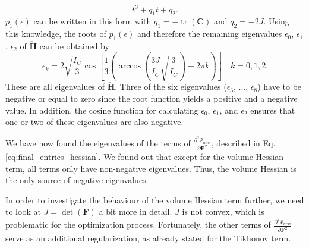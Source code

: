 {{{\[
t^3 + q_1t + q_2. 
\]
$p_1(\epsilon)$ can be written in this form with $q_1=-\operatorname{tr}(\mathbf{C})$ and $q_2= -2J$. Using this knowledge, the roots of $p_1(\epsilon)$ and therefore the remaining eigenvalues $\epsilon_0$, $\epsilon_1$, $\epsilon_2$ of $\mathbf{\check{H}}$ can be obtained by
\begin{equation}
\label{eq:hessian_eigenvalues2}
	\epsilon_k = 2 \sqrt{\frac{I_C}{3}} \operatorname{cos}\left[ \frac{1}{3} \left( \operatorname{arccos}\left(\frac{3 J}{I_C} \sqrt{\frac{3}{I_C}} \right) + 2 \pi k \right) \right] \quad  k= 0,1,2.
\end{equation}
These are all eigenvalues of $\mathbf{\check{H}}$. Three of the six eigenvalues ($\epsilon_3$, ..., $\epsilon_8$) have to be negative or equal to zero since the root function yields a positive and a negative value. In addition, the cosine function for calculating $\epsilon_0$, $\epsilon_1$, and $\epsilon_2$ ensures that one or two of these eigenvalues are also negative. 

We have now found the eigenvalues of the terms of $\frac{\partial^2 \Psi_{new}}{\partial \mathbf{F}^2}$, described in Eq. \eqref{eq:final_entries_hessian}. We found out that except for the volume Hessian term, all terms only have non-negative eigenvalues. Thus, the volume Hessian is the only source of negative eigenvalues.

In order to investigate the behaviour of the volume Hessian term further, we need to look at $J = \operatorname{det}(\mathbf{F})$ a bit more in detail. $J$ is not convex, which is problematic for the optimization process. Fortunately, the other terms of $\frac{\partial^2 \Psi_{new}}{\partial \mathbf{F}^2}$ serve as an additional regularization, as already stated for the Tikhonov term.

}}}
